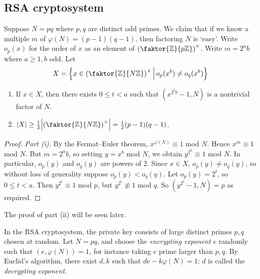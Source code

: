 \subsection{RSA cryptosystem}
Suppose \( N = pq \) where \( p, q \) are distinct odd primes.
We claim that if we know a multiple \( m \) of \( \varphi(N) = (p-1)(q-1) \), then factoring \( N \) is `easy'.
Write \( o_p(x) \) for the order of \( x \) as an element of \( \qty(\faktor{\mathbb Z}{p\mathbb Z})^\times \).
Write \( m = 2^a b \) where \( a \geq 1, b \) odd.
Let
\[ X = \qty{x \in \qty(\faktor{\mathbb Z}{N\mathbb Z})^\times \midd o_p(x^b) \neq o_q(x^b)} \]
\begin{theorem}
    \begin{enumerate}
        \item If \( x \in X \), then there exists \( 0 \leq t < a \) such that \( (x^{2^t b} - 1, N) \) is a nontrivial factor of \( N \).
        \item \( \abs{X} \geq \frac{1}{2} \abs{\qty(\faktor{\mathbb Z}{N\mathbb Z})^\times} = \frac{1}{2}(p-1)(q-1) \).
    \end{enumerate}
\end{theorem}
\begin{proof}
    \emph{Part (i).}
    By the Fermat--Euler theorem, \( x^{\varphi(N)} \equiv 1 \) mod \( N \).
    Hence \( x^m \equiv 1 \) mod \( N \).
    But \( m = 2^a b \), so setting \( y = x^b \) mod \( N \), we obtain \( y^{2^a} \equiv 1 \) mod \( N \).
    In particular, \( o_p(y) \) and \( o_q(y) \) are powers of 2.
    Since \( x \in X \), \( o_p(y) \neq o_q(y) \), so without loss of generality suppose \( o_p(y) < o_q(y) \).
    Let \( o_p(y) = 2^t \), so \( 0 \leq t < a \).
    Then \( y^{2^t} \equiv 1 \) mod \( p \), but \( y^{2^t} \not\equiv 1 \) mod \( q \).
    So \( (y^{2^t} - 1, N) = p \) as required.
\end{proof}
The proof of part (ii) will be seen later.

In the RSA cryptosystem, the private key consists of large distinct primes \( p, q \) chosen at random.
Let \( N = pq \), and choose the \emph{encrypting exponent} \( e \) randomly such that \( (e, \varphi(N)) = 1 \), for instance taking \( e \) prime larger than \( p, q \).
By Euclid's algorithm, there exist \( d, k \) such that \( de - k\varphi(N) = 1 \); \( d \) is called the \emph{decrypting exponent}.

